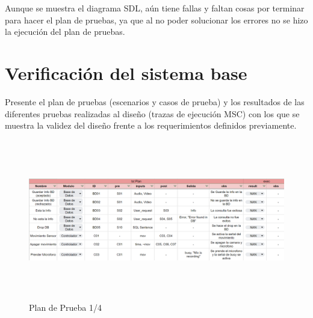 \pagebreak

Aunque se muestra el diagrama SDL, aún tiene fallas y faltan cosas por terminar para hacer el plan de pruebas, ya que al no poder solucionar los errores no se hizo la ejecución del plan de pruebas.

\section{Verificación del sistema base}

    Presente el plan de pruebas (escenarios y casos de prueba) y los resultados de las diferentes pruebas realizadas al diseño (trazas de ejecución MSC) con los que se muestra la validez del diseño frente a los requerimientos definidos previamente.

\begin{figure}[!h]
    \centering
    \includegraphics[width=16.5cm, height=7cm]{images/PDP1.PNG}
    \caption{Plan de Prueba 1/4}
    \label{fig:PDP1}
\end{figure}

